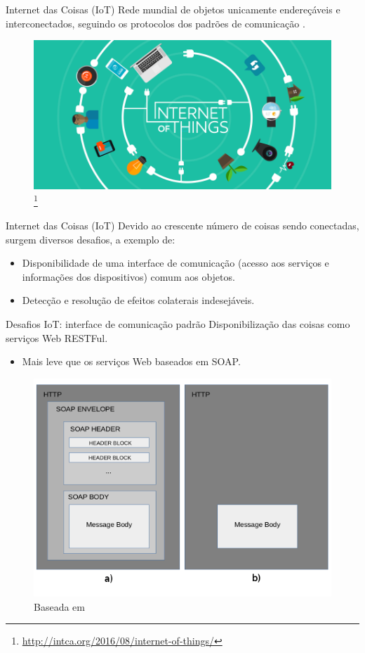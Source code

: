 \documentclass[brazil]{beamer}
\begin{document}
\begin{frame}{Internet das Coisas (IoT)}
Rede mundial de objetos unicamente endereçáveis e interconectados, seguindo os protocolos dos padrões de comunicação \cite{iot2020:2008}.
\begin{figure}[!htb] \centering 
  \centering
  \includegraphics[width=.8\columnwidth]{slide/iot} 
  \caption{\footnote[frame]{\url{http://intca.org/2016/08/internet-of-things/}}} 
  \label{fig:iot}
\end{figure}
\end{frame}

\begin{frame}{Internet das Coisas (IoT)}
Devido ao crescente número de coisas sendo conectadas, surgem diversos desafios, a exemplo de:
  \begin{itemize}
    \item<1 -> Disponibilidade de uma interface de comunicação (acesso aos serviços e informações dos dispositivos) comum aos objetos.
    \item<2 -> Detecção e resolução de efeitos colaterais indesejáveis.
  \end{itemize}
\end{frame}

\begin{frame}{Desafios IoT: interface de comunicação padrão}
Disponibilização das coisas como serviços Web RESTFul.
  \begin{itemize}
    \item Mais leve que os serviços Web baseados em SOAP.
  \end{itemize}
\begin{figure}[!htb] \centering 
  \centering
  \includegraphics[width=.8\columnwidth]{slide/messages_restXsoap} 
  \caption{Baseada em \cite{Pautasso:2014}} 
  \label{fig:messages_restXsoap}
\end{figure}
\end{frame}
\end{document}

